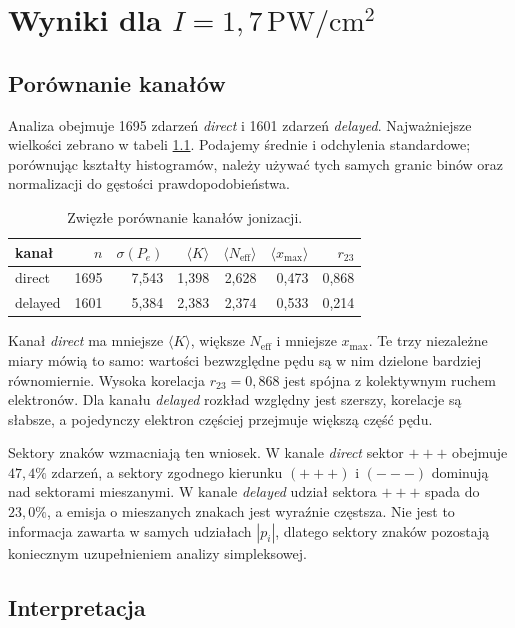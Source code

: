 \documentclass[12pt,letterpaper,oneside]{report}
\numberwithin{equation}{chapter}
\numberwithin{figure}{chapter}
\numberwithin{table}{chapter}
\newcommand{\Pe}{\ensuremath{P_e}}
\begin{document}
\chapter{Wyniki dla \(I=1{,}7\,\mathrm{PW/cm^2}\)}

\section{Porównanie kanałów}

Analiza obejmuje 1695 zdarzeń \textit{direct} i 1601 zdarzeń
\textit{delayed}. Najważniejsze wielkości zebrano w tabeli
\ref{tab:results-main1}. Podajemy średnie i odchylenia standardowe;
porównując kształty histogramów, należy używać tych samych granic binów
oraz normalizacji do gęstości prawdopodobieństwa.

\begin{table}[htbp]
\centering
\caption{Zwięzłe porównanie kanałów jonizacji.}
\label{tab:results-main1}
\begin{tabular}{lrrrrrr}
\toprule
kanał & \(n\) & \(\sigma(\Pe{})\) & \(\langle K\rangle\) &
\(\langle N_{\mathrm{eff}}\rangle\) & \(\langle x_{\max}\rangle\) &
\(r_{23}\)\\
\midrule
direct  & 1695 & 7,543 & 1,398 & 2,628 & 0,473 & 0,868\\
delayed & 1601 & 5,384 & 2,383 & 2,374 & 0,533 & 0,214\\
\bottomrule
\end{tabular}
\end{table}

Kanał \textit{direct} ma mniejsze \(\langle K\rangle\), większe
\(N_{\mathrm{eff}}\) i mniejsze \(x_{\max}\). Te trzy niezależne miary
mówią to samo: wartości bezwzględne pędu są w nim dzielone bardziej
równomiernie. Wysoka korelacja \(r_{23}=0{,}868\) jest spójna z
kolektywnym ruchem elektronów. Dla kanału \textit{delayed} rozkład
względny jest szerszy, korelacje są słabsze, a pojedynczy elektron
częściej przejmuje większą część pędu.

Sektory znaków wzmacniają ten wniosek. W kanale \textit{direct} sektor
\(+++\) obejmuje \(47{,}4\%\) zdarzeń, a sektory zgodnego kierunku
\((+++)\) i \((---)\) dominują nad sektorami mieszanymi. W kanale
\textit{delayed} udział sektora \(+++\) spada do \(23{,}0\%\), a emisja
o mieszanych znakach jest wyraźnie częstsza. Nie jest to informacja
zawarta w samych udziałach \(|p_i|\), dlatego sektory znaków pozostają
koniecznym uzupełnieniem analizy simpleksowej.

\section{Interpretacja}
\end{document}
